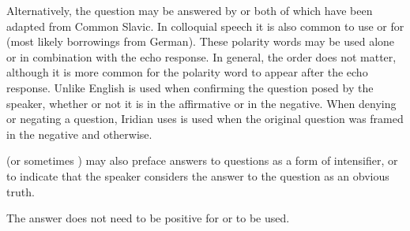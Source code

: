 \ex
{}
\xe

Alternatively, the question may be answered by  or  both of which have been adapted from Common Slavic. In colloquial speech it is also common to use  or  for  (most likely borrowings from German). These polarity words may be used alone or in combination with the echo response. In general, the order does not matter, although it is more common for the polarity word to appear after the echo response. Unlike English   is used when confirming the question posed by the speaker, whether or not it is in the affirmative or in the negative. When denying or negating a question, Iridian uses  is used when the original question was framed in the negative and  otherwise.

\ex
{}\xe

\ex{}
\xe

 (or sometimes ) may also preface answers to questions as a form of intensifier, or to indicate that the speaker considers the answer to the question as an obvious truth.

\ex
{}\xe

The answer does not need to be positive for  or  to be used.

\ex{}
\xe


